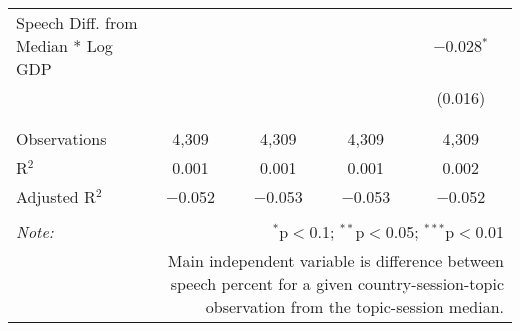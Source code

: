 \begin{table}[!htbp]
\begin{tabular}{@{\extracolsep{5pt}}lcccc}
 Speech Diff. from Median * Log GDP &  &  &  & $-$0.028$^{*}$ \\ 
  &  &  &  & (0.016) \\ 
  & & & & \\ 
\hline \\[-1.8ex] 
Observations & 4,309 & 4,309 & 4,309 & 4,309 \\ 
R$^{2}$ & 0.001 & 0.001 & 0.001 & 0.002 \\ 
Adjusted R$^{2}$ & $-$0.052 & $-$0.053 & $-$0.053 & $-$0.052 \\ 
\hline 
\hline \\[-1.8ex] 
\textit{Note:}  & \multicolumn{4}{r}{$^{*}$p$<$0.1; $^{**}$p$<$0.05; $^{***}$p$<$0.01} \\ 
 & \multicolumn{4}{r}{Main independent variable is difference between speech percent for a given country-session-topic observation from the topic-session median.} \\ 
\end{tabular} 
\end{table} 
